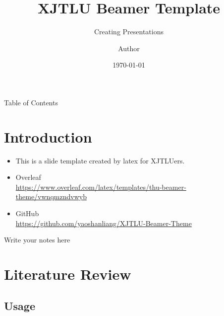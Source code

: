 \documentclass{libs/XJTLU_format}
\title[XJTLU Beamer Template]{\huge\textbf{XJTLU Beamer Template}}
\subtitle{Creating Presentations}
\author{Author}
\institute[XJTLU]{
    \normalsize{\email{author@xjtlu.edu.cn}}
    \newline
    \department{School of Advanced Technology}
    \newline
    \university{Xi’an Jiaotong-Liverpool University}
}
\date{\today}
\begin{document}


\begin{frame}{}
    \maketitle
\end{frame}

\begin{frame}{Table of Contents}
    \begin{multicols}{2}
        \tableofcontents
    \end{multicols}
\end{frame}

\section{Introduction}

\begin{frame}
    \begin{itemize}[<+-| alert@+>] %
    	\item This is a slide template created by latex for XJTLUers.
        \item Overleaf  \\ \url{https://www.overleaf.com/latex/templates/thu-beamer-theme/vwnqmzndvwyb}
        \item GitHub \\ \url{https://github.com/yaoshanliang/XJTLU-Beamer-Theme}
    \end{itemize}
    
    \begin{note}
        {Write your notes here}
    \end{note}
\end{frame}

\section{Literature Review}

\subsection{Usage}
\end{document}
